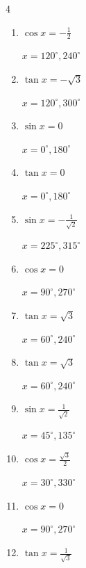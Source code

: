 \begin{multicols}{4}
\begin{enumerate}
        $\displaystyle x = 90^{\circ} , 270^{\circ}$

  \item $\displaystyle \cos{x}  = -\frac{1}{2}$

        $\displaystyle x = 120^{\circ} , 240^{\circ}$

  \item $\displaystyle \tan{x}  = -\sqrt{3}$

        $\displaystyle x = 120^{\circ} , 300^{\circ}$

  \item $\displaystyle \sin{x}  = 0$

        $\displaystyle x = 0^{\circ} , 180^{\circ}$

  \item $\displaystyle \tan{x}  = 0$

        $\displaystyle x = 0^{\circ} , 180^{\circ}$

  \item $\displaystyle \sin{x}  = -\frac{1}{\sqrt{2}}$

        $\displaystyle x = 225^{\circ} , 315^{\circ}$

  \item $\displaystyle \cos{x}  = 0$

        $\displaystyle x = 90^{\circ} , 270^{\circ}$

  \item $\displaystyle \tan{x}  = \sqrt{3}$

        $\displaystyle x = 60^{\circ} , 240^{\circ}$

  \item $\displaystyle \tan{x}  = \sqrt{3}$

        $\displaystyle x = 60^{\circ} , 240^{\circ}$

  \item $\displaystyle \sin{x}  = \frac{1}{\sqrt{2}}$

        $\displaystyle x = 45^{\circ} , 135^{\circ}$

  \item $\displaystyle \cos{x}  = \frac{\sqrt{3}}{2}$

        $\displaystyle x = 30^{\circ} , 330^{\circ}$

  \item $\displaystyle \cos{x}  = 0$

        $\displaystyle x = 90^{\circ} , 270^{\circ}$

  \item $\displaystyle \tan{x}  = \frac{1}{\sqrt{3}}$


\end{enumerate}
\end{multicols}
